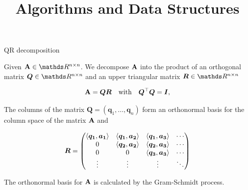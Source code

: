 \documentclass[11pt,compress,t,notes=noshow, xcolor=table]{beamer}
\title{Algorithms and Data Structures}
\begin{document}

\begin{vbframe}{QR decomposition}


Given $\Amat \in \R^{n \times n}$. We decompose $\mathbf{A}$ into the product of an orthogonal matrix $\bm{Q}\in \R^{n \times n}$ and an upper triangular matrix $\bm{R} \in \R^{n \times n}$

$$
\mathbf{A} = \bm{QR} \quad \mbox{with} \quad \bm{Q}^\top\bm{Q} = \bm{I},
$$

The columns of the matrix $\bm{Q} = (\bm{q}_1, \ldots, \bm{q}_n)$ form an orthonormal basis for the column space of the matrix $\mathbf{A}$ and

$$
\bm{R} = \begin{pmatrix} 
\langle \bm{q_1}, \bm{a_1} \rangle & \langle \bm{q_1}, \bm{a_2} \rangle & \langle \bm{q_1}, \bm{a_3} \rangle & \cdots \\
0                                  & \langle \bm{q_2}, \bm{a_2} \rangle & \langle \bm{q_2}, \bm{a_3} \rangle & \cdots \\
0                                  & 0                                  & \langle \bm{q_3}, \bm{a_3} \rangle & \cdots \\
\vdots                             & \vdots                             & \vdots                             & \ddots \\ \end{pmatrix}
$$

The orthonormal basis for $\mathbf{A}$ is calculated by the Gram-Schmidt process.

\end{vbframe}
\end{document}
